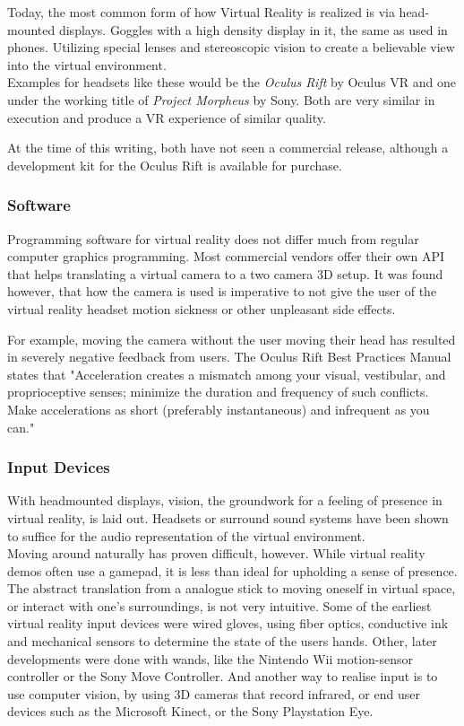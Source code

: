 \documentclass[11pt]{article}
\begin{document}
		Today, the most common form of how Virtual Reality is realized is via head-mounted displays. Goggles with a high density display in it, the same as used in phones. Utilizing special lenses and stereoscopic vision to create a believable view into the virtual environment. \\
		Examples for headsets like these would be the \emph{Oculus Rift} by Oculus VR and one under the working title of \emph{Project Morpheus} by Sony. Both are very similar in execution and produce a VR experience of similar quality. \cite{goradia2014review}
	
	
	At the time of this writing, both have not seen a commercial release, although a development kit for the Oculus Rift is available for purchase.

	\subsubsection{Software}
		Programming software for virtual reality does not differ much from regular computer graphics programming. Most commercial vendors offer their own API that helps translating a virtual camera to a two camera 3D setup. It was found however, that how the camera is used is imperative to not give the user of the virtual reality headset motion sickness or other unpleasant side effects. \cite{seppanen14}
		
		
		For example, moving the camera without the user moving their head has resulted in severely negative feedback from users. The Oculus Rift Best Practices Manual states that "Acceleration creates a mismatch among your visual, vestibular, and proprioceptive senses; minimize the duration and frequency of such conflicts. Make accelerations as short (preferably instantaneous) and infrequent as you can." \cite{yao2014oculus}
	
	\subsubsection{Input Devices}
	With headmounted displays, vision, the groundwork for a feeling of presence in virtual reality, is laid out. Headsets or surround sound systems have been shown to suffice for the audio representation of the virtual environment.\\
	Moving around naturally has proven difficult, however. While virtual reality demos often use a gamepad, it is less than ideal for upholding a sense of presence. The abstract translation from a analogue stick to moving oneself in virtual space, or interact with one's surroundings, is not very intuitive. \cite{ruddle13} Some of the earliest virtual reality input devices were wired gloves, using fiber optics, conductive ink and mechanical sensors to determine the state of the users hands. \cite{boas13} Other, later developments were done with wands, like the Nintendo Wii motion-sensor controller or the Sony Move Controller. \cite{boas13} And another way to realise input is to use computer vision, by using 3D cameras that record infrared, or end user devices such as the Microsoft Kinect, or the Sony Playstation Eye. \cite{boas13}
	
\end{document}
